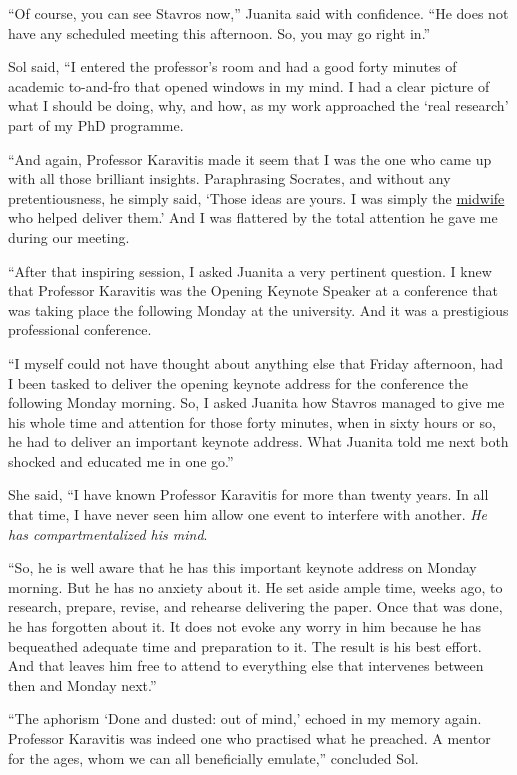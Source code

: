 \documentclass[
  a4paper,
]{article}
\begin{document}
``Of course, you can see Stavros now,'' Juanita said with confidence.
``He does not have any scheduled meeting this afternoon. So, you may go
right in.''

Sol said, ``I entered the professor's room and had a good forty minutes
of academic to-and-fro that opened windows in my mind. I had a clear
picture of what I should be doing, why, and how, as my work approached
the `real research' part of my PhD programme.

``And again, Professor Karavitis made it seem that I was the one who
came up with all those brilliant insights. Paraphrasing Socrates, and
without any pretentiousness, he simply said, `Those ideas are yours. I
was simply the
\href{https://philosophycourse.info/lecsite/lec-socmidwife.html}{midwife}
who helped deliver them.' And I was flattered by the total attention he
gave me during our meeting.

``After that inspiring session, I asked Juanita a very pertinent
question. I knew that Professor Karavitis was the Opening Keynote
Speaker at a conference that was taking place the following Monday at
the university. And it was a prestigious professional conference.

``I myself could not have thought about anything else that Friday
afternoon, had I been tasked to deliver the opening keynote address for
the conference the following Monday morning. So, I asked Juanita how
Stavros managed to give me his whole time and attention for those forty
minutes, when in sixty hours or so, he had to deliver an important
keynote address. What Juanita told me next both shocked and educated me
in one go.''

She said, ``I have known Professor Karavitis for more than twenty years.
In all that time, I have never seen him allow one event to interfere
with another. \emph{He has compartmentalized his mind}.

``So, he is well aware that he has this important keynote address on
Monday morning. But he has no anxiety about it. He set aside ample time,
weeks ago, to research, prepare, revise, and rehearse delivering the
paper. Once that was done, he has forgotten about it. It does not evoke
any worry in him because he has bequeathed adequate time and preparation
to it. The result is his best effort. And that leaves him free to attend
to everything else that intervenes between then and Monday next.''

``The aphorism `Done and dusted: out of mind,' echoed in my memory
again. Professor Karavitis was indeed one who practised what he
preached. A mentor for the ages, whom we can all beneficially emulate,''
concluded Sol.
\end{document}
